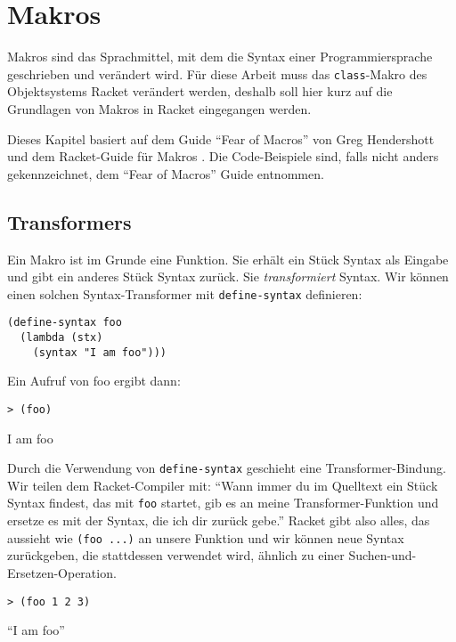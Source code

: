 \chapter{Makros} 
\label{makros}
Makros sind das Sprachmittel, mit dem die Syntax einer Programmiersprache geschrieben und verändert wird. Für diese Arbeit muss das \texttt{class}-Makro des Objektsystems Racket verändert werden, deshalb soll hier kurz auf die Grundlagen von Makros in Racket eingegangen werden.

Dieses Kapitel basiert auf dem Guide ``Fear of Macros'' von Greg Hendershott \cite{fearofmacros} und dem Racket-Guide für Makros \cite{racketguide-macros}. Die Code-Beispiele sind, falls nicht anders gekennzeichnet, dem ``Fear of Macros'' Guide entnommen.


\section{Transformers}

Ein Makro ist im Grunde eine Funktion. Sie erhält ein Stück Syntax als Eingabe und gibt ein anderes Stück Syntax zurück. Sie \textit{transformiert} Syntax. Wir können einen solchen Syntax-Transformer mit \texttt{define-syntax} definieren:

\begin{lstlisting}
(define-syntax foo
  (lambda (stx)
    (syntax "I am foo")))
\end{lstlisting}

Ein Aufruf von foo ergibt dann:

\begin{lstlisting}
> (foo)
\end{lstlisting}
{\routput {\qq}I am foo{\qq}}

Durch die Verwendung von \texttt{define-syntax} geschieht eine Transformer-Bindung. Wir teilen dem Racket-Compiler mit: ``Wann immer du im Quelltext ein Stück Syntax findest, das mit \texttt{foo} startet, gib es an meine Transformer-Funktion und ersetze es mit der Syntax, die ich dir zurück gebe.'' Racket gibt also alles, das aussieht wie \texttt{(foo ...)} an unsere Funktion und wir können neue Syntax zurückgeben, die stattdessen verwendet wird, ähnlich zu einer Suchen-und-Ersetzen-Operation.

\begin{lstlisting}
> (foo 1 2 3)
\end{lstlisting}
{\routput ``I am foo''}


